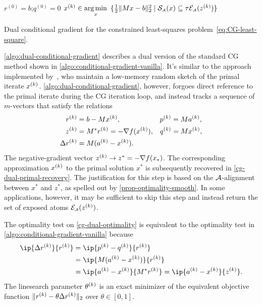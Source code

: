 \begin{algorithm}[t]
  \DontPrintSemicolon\setcounter{AlgoLine}{-1}
  $r^{(0)}=b$;\enspace $q^{(0)}=0$\; 
  $x^{(k)} \in
  \underset{x}{\textrm{arg}\,{\min}}\enskip \{\frac{1}{2}\|Mx - b\|_2^2 \mid \operatorname{\mathcal{S}_{\scriptscriptstyle\mathcal{A}}}(x) \subseteq
    \tau\mathcal{E}_{\scriptscriptstyle\mathcal{A}}(z^{(k)})\}$\label{cg-dual-primal-recovery}\;
  \;
  \caption{Dual conditional gradient for the constrained least-squares problem~\eqref{eq:CG-least-square}.\label{algo:dual-conditional-gradient}}
\end{algorithm}

\autoref{algo:dual-conditional-gradient} describes a dual version of the standard
CG method shown in \autoref{algo:conditional-gradient-vanilla}. It's similar to the
approach implemented by~\citet{yurtsever2017sketchy}, who maintain a low-memory
random sketch of the primal iterate $x^{(k)}$.
\autoref{algo:dual-conditional-gradient}, however, forgoes direct reference to the
primal iterate during the CG iteration loop, and instead tracks a sequence of
$m$-vectors that satisfy the relations
\begin{align*}
   r^{(k)} &= b - Mx^{(k)},               &   p^{(k)} &= Ma^{(k)},
\\ z^{(k)} &= M^*r^{(k)}=-\nabla f(x^{(k)}),  &   q^{(k)} &= Mx^{(k)},
\\ \Delta r^{(k)} &= M(a^{(k)}-x^{(k)}).
\end{align*}
The negative-gradient vector $z^{(k)} \to z^* = -\nabla f(x_*)$. The
corresponding approximation $x^{(k)}$ to the primal solution $x^*$ is subsequently
recovered in \autoref{cg-dual-primal-recovery}. The justification for this step is
based on the $\mathcal{A}$-alignment between $x^*$ and $z^*$, as spelled out by
\autoref{prop-optimality-smooth}. In some applications, however, it may be
sufficient to skip this step and instead return the set of exposed atoms
$\mathcal{E}_{\scriptscriptstyle\mathcal{A}}(z^{(k)})$.

The optimality test on \autoref{cg-dual-optimality} is equivalent to the optimality
test in \autoref{algo:conditional-gradient-vanilla} because
\begin{align*}
  \ip{\Delta r\k}{r\k}
  &= \ip{p\k - q\k}{r\k}
\\&= \ip{M(a\k - x\k)}{r\k}
\\&=\ip{a\k-x\k}{M^*r\k} = \ip{a\k-x\k}{z\k}.
\end{align*}
The linesearch parameter $\theta^{(k)}$ is an exact minimizer of the equivalent
objective function $\|r^{(k)}-\theta\Delta r^{(k)}\|_2$ over $\theta \in [0, 1]$.

